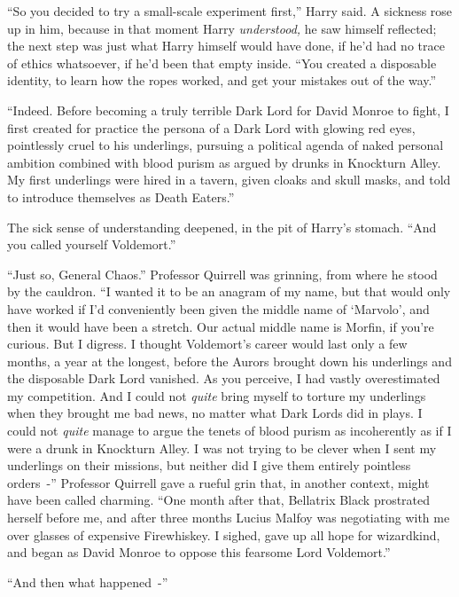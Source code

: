``So you decided to try a small-scale experiment first,'' Harry said. A sickness rose up in him, because in that moment Harry \emph{understood,} he saw himself reflected; the next step was just what Harry himself would have done, if he'd had no trace of ethics whatsoever, if he'd been that empty inside. ``You created a disposable identity, to learn how the ropes worked, and get your mistakes out of the way.''

``Indeed. Before becoming a truly terrible Dark Lord for David Monroe to fight, I first created for practice the persona of a Dark Lord with glowing red eyes, pointlessly cruel to his underlings, pursuing a political agenda of naked personal ambition combined with blood purism as argued by drunks in Knockturn Alley. My first underlings were hired in a tavern, given cloaks and skull masks, and told to introduce themselves as Death Eaters.''

The sick sense of understanding deepened, in the pit of Harry's stomach. ``And you called yourself Voldemort.''

``Just so, General Chaos.'' Professor Quirrell was grinning, from where he stood by the cauldron. ``I wanted it to be an anagram of my name, but that would only have worked if I'd conveniently been given the middle name of `Marvolo', and then it would have been a stretch. Our actual middle name is Morfin, if you're curious. But I digress. I thought Voldemort's career would last only a few months, a year at the longest, before the Aurors brought down his underlings and the disposable Dark Lord vanished. As you perceive, I had vastly overestimated my competition. And I could not \emph{quite} bring myself to torture my underlings when they brought me bad news, no matter what Dark Lords did in plays. I could not \emph{quite} manage to argue the tenets of blood purism as incoherently as if I were a drunk in Knockturn Alley. I was not trying to be clever when I sent my underlings on their missions, but neither did I give them entirely pointless orders~-'' Professor Quirrell gave a rueful grin that, in another context, might have been called charming. ``One month after that, Bellatrix Black prostrated herself before me, and after three months Lucius Malfoy was negotiating with me over glasses of expensive Firewhiskey. I sighed, gave up all hope for wizardkind, and began as David Monroe to oppose this fearsome Lord Voldemort.''

``And then what happened~-''

